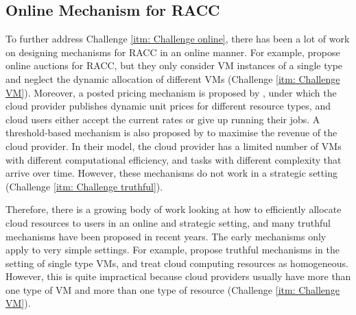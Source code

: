 \documentclass[11pt]{phdthesis}
\begin{document}
\subsection{Online Mechanism for RACC}
To further address Challenge \ref{itm: Challenge online}, there has been a lot of work on designing mechanisms for RACC in an online manner. For example, \citet{wang2013revenue,zhang2016framework} propose online auctions for RACC, but they only consider VM instances of a single type and neglect the dynamic allocation of different VMs (Challenge \ref{itm: Challenge VM}). Moreover, a posted pricing mechanism is proposed by \citet{zhang2017optimal}, under which the cloud provider publishes dynamic unit prices for different resource types, and cloud users either accept the current rates or give up running their jobs. A threshold-based mechanism is also proposed by \citet{farooq2018adaptive} to maximise the revenue of the cloud provider. In their model, the cloud provider has a limited number of VMs with different computational efficiency, and tasks with different complexity that arrive over time. However, these mechanisms do not work in a strategic setting (Challenge \ref{itm: Challenge truthful}). 

Therefore, there is a growing body of work looking at how to efficiently allocate cloud resources to users in an online and strategic setting, and many truthful mechanisms have been proposed in recent years. The early mechanisms only apply to very simple settings. For example, \citet{wang2012pcloud,zhang2016framework} propose truthful mechanisms in the setting of single type VMs, and \citet{lin2010dynamic} treat cloud computing resources as homogeneous. However, this is quite impractical because cloud providers usually have more than one type of VM and more than one type of resource (Challenge \ref{itm: Challenge VM}).
\end{document}
